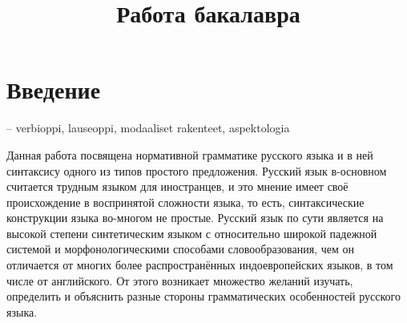 \documentclass{article}
\title{Работа бакалавра}
\begin{document}


\tableofcontents

\pagebreak


\section{Введение}

-- verbioppi, lauseoppi, modaaliset rakenteet, aspektologia

Данная работа посвящена нормативной грамматике русского языка и в ней синтаксису одного из типов простого предложения. Русский язык в-основном считается трудным языком для иностранцев, и это мнение имеет своё происхождение в воспринятой сложности языка, то есть, синтаксические конструкции языка во-многом не простые. Русский язык по сути является на высокой степени синтетическим языком с относительно широкой падежной системой и морфонологическими способами словообразования, чем он отличается от многих более распространённых индоевропейских языков, в том числе от английского. От этого возникает множество желаний изучать, определить и объяснить разные стороны грамматических особенностей русского языка.
\end{document}
